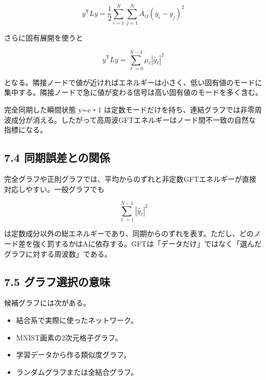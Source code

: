 \documentclass[11pt,a4paper]{ltjsarticle}
\begin{document}
\[
y^{\mathsf T}Ly=\frac{1}{2}\sum_{i=1}^{N}\sum_{j=1}^{N}A_{ij}(y_i-y_j)^2
\]

さらに固有展開を使うと\par

\[
y^{\mathsf T}Ly=\sum_{\ell=0}^{N-1}\mu_{\ell}|\widehat{y}_{\ell}|^2
\]

となる。隣接ノードで値が近ければエネルギーは小さく、低い固有値のモードに集中する。隣接ノードで急に値が変わる信号は高い固有値のモードを多く含む。\par

完全同期した瞬間状態 y=c・1 は定数モードだけを持ち、連結グラフでは非零周波成分が消える。したがって高周波GFTエネルギーはノード間不一致の自然な指標になる。\par

\subsection*{\textcolor{researchblue}{7.4 同期誤差との関係}}

完全グラフや正則グラフでは、平均からのずれと非定数GFTエネルギーが直接対応しやすい。一般グラフでも\par

\[
\sum_{\ell=1}^{N-1}|\widehat{y}_{\ell}|^2
\]

は定数成分以外の総エネルギーであり、同期からのずれを表す。ただし、どのノード差を強く罰するかはAに依存する。GFTは「データだけ」ではなく「選んだグラフに対する周波数」である。\par

\subsection*{\textcolor{researchblue}{7.5 グラフ選択の意味}}

候補グラフには次がある。\par

\begin{itemize}

\item 結合系で実際に使ったネットワーク。

\item MNIST画素の2次元格子グラフ。

\item 学習データから作る類似度グラフ。

\item ランダムグラフまたは全結合グラフ。

\end{itemize}
\end{document}
